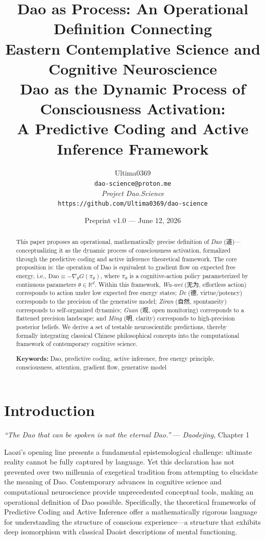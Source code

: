 \documentclass[11pt,a4paper]{article}
\title{\textbf{Dao as Process: An Operational Definition Connecting\\Eastern Contemplative Science and Cognitive Neuroscience}\\%
\large Dao as the Dynamic Process of Consciousness Activation:\\A Predictive Coding and Active Inference Framework}
\author{Ultima0369\\
\texttt{dao-science@proton.me}\\[4pt]
\textit{Project Dao.Science}\\
\texttt{https://github.com/Ultima0369/dao-science}}
\date{Preprint v1.0 — June 12, 2026}
\begin{document}
\maketitle

\begin{abstract}
This paper proposes an operational, mathematically precise definition of \textit{Dao} (道)---conceptualizing it as the dynamic process of consciousness activation, formalized through the predictive coding and active inference theoretical framework. The core proposition is: the operation of Dao is equivalent to gradient flow on expected free energy, i.e., $\text{Dao} \equiv -\nabla_\theta G(\pi_\theta)$, where $\pi_\theta$ is a cognitive-action policy parameterized by continuous parameters $\theta \in \mathbb{R}^d$. Within this framework, \textit{Wu-wei} (无为, effortless action) corresponds to action under low expected free energy states; \textit{De} (德, virtue/potency) corresponds to the precision of the generative model; \textit{Ziran} (自然, spontaneity) corresponds to self-organized dynamics; \textit{Guan} (观, open monitoring) corresponds to a flattened precision landscape; and \textit{Ming} (明, clarity) corresponds to high-precision posterior beliefs. We derive a set of testable neuroscientific predictions, thereby formally integrating classical Chinese philosophical concepts into the computational framework of contemporary cognitive science.

\textbf{Keywords:} Dao, predictive coding, active inference, free energy principle, consciousness, attention, gradient flow, generative model
\end{abstract}

\section{Introduction}

\textit{``The Dao that can be spoken is not the eternal Dao.''} --- \textit{Daodejing}, Chapter 1

Laozi's opening line presents a fundamental epistemological challenge: ultimate reality cannot be fully captured by language. Yet this declaration has not prevented over two millennia of exegetical tradition from attempting to elucidate the meaning of Dao. Contemporary advances in cognitive science and computational neuroscience provide unprecedented conceptual tools, making an operational definition of Dao possible. Specifically, the theoretical frameworks of Predictive Coding \cite{Rao1999,Friston2010,Clark2015} and Active Inference \cite{Friston2017} offer a mathematically rigorous language for understanding the structure of conscious experience---a structure that exhibits deep isomorphism with classical Daoist descriptions of mental functioning.
\end{document}
